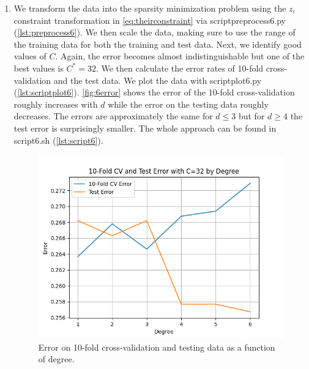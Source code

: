\begin{enumerate}
\begin{enumerate}
        \item We transform the data into the sparsity minimization problem
        using the $z_i$ constraint transformation in \autoref{eq:theirconstraint}
        via scriptpreprocess6.py (\autoref{lst:preprocess6}).
        We then scale the data, making sure to use the range of the training
        data for both the training and test data.
        Next, we identify good values of $C$.
        Again, the error becomes almost indistinguishable but one of the best
        values is $C^*=32$.
        We then calculate the error
        rates of 10-fold cross-validation and the test data.
        We plot the data with scriptplot6.py (\autoref{lst:scriptplot6}).
        \autoref{fig:6error} shows the error of the 10-fold cross-validation
        roughly increases with $d$ while the error on the testing data
        roughly decreases.
        The errors are approximately the same for $d\leq3$ but for $d\geq4$ the
        test error is surprisingly smaller.
        The whole approach can be found in script6.sh (\autoref{lst:script6}).
        \begin{figure}[ht]
            \begin{center}
                \includegraphics[width=.45\textwidth]{graphics/hw2/6error.png}
            \end{center}
            \caption{Error on 10-fold cross-validation and
            testing data as a function of degree.}
            \label{fig:6error}
        \end{figure} 


    \end{enumerate}
\end{enumerate}

\appendix
